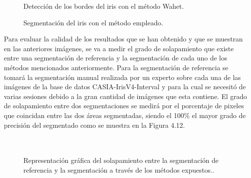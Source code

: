 \begin{figure}[htbp]
\centering
{}
\caption{Detección de los bordes del iris con el método Wahet.} \label{fig:señales}
\end{figure}


\begin{figure}[htbp]
\centering
{}
\caption{Segmentación del iris con el método empleado.} \label{fig:señales}
\end{figure}

Para evaluar la calidad de los resultados que se han obtenido y que se muestran en las anteriores imágenes, se va a medir el grado de solapamiento que existe entre una segmentación de referencia y la segmentación de cada uno de los métodos mencionados anteriormente. Para la segmentación de referencia se tomará la segmentación manual realizada por un experto sobre cada una de las imágenes de la base de datos CASIA-IrisV4-Interval y para la cual se necesitó de varias sesiones debido a la gran cantidad de imágenes que esta contiene. El grado de solapamiento entre dos segmentaciones se medirá por el porcentaje de pixeles que coincidan entre las dos áreas segmentadas, siendo el 100\% el mayor grado de precisión del segmentado como se muestra en la Figura 4.12. \\ \\ \\

\begin{figure}[htbp]
\centering
{}
\caption{Representación gráfica del solapamiento entre la segmentación de referencia y la segmentación a través de los métodos expuestos..} \label{fig:señales}
\end{figure}

